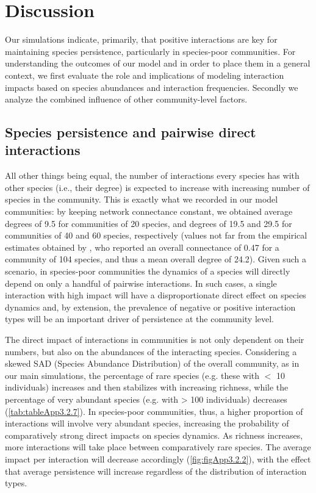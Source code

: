 \section{Discussion}

Our simulations indicate, primarily, that positive interactions are key for maintaining species persistence, particularly in species-poor communities. For understanding the outcomes of our model and in order to place them in a general context, we first evaluate the role and implications of modeling interaction impacts based on species abundances and interaction frequencies. Secondly we analyze the combined influence of other community-level factors.

\subsection*{Species persistence and pairwise direct interactions}

All other things being equal, the number of interactions every species has with other species (i.e., their degree) is expected to increase with increasing number of species in the community. This is exactly what we recorded in our model communities: by keeping network connectance constant, we obtained average degrees of 9.5 for communities of 20 species, and degrees of 19.5 and 29.5 for communities of 40 and 60 species, respectively (values not far from the empirical estimates obtained by \cite{Kefi2015}, who reported an overall connectance of 0.47 for a community of 104 species, and thus a mean overall degree of 24.2). Given such a scenario, in species-poor communities the dynamics of a species will directly depend on only a handful of pairwise interactions. In such cases, a single interaction with high impact will have a disproportionate direct effect on species dynamics and, by extension, the prevalence of negative or positive interaction types will be an important driver of persistence at the community level.

The direct impact of interactions in communities is not only dependent on their numbers, but also on the abundances of the interacting species. Considering a skewed SAD (Species Abundance Distribution) of the overall community, as in our main simulations, the percentage of rare species (e.g. these with $<$ 10 individuals) increases and then stabilizes with increasing richness, while the percentage of very abundant species (e.g. with > 100 individuals) decreases (\cref{tab:tableApp3.2.7}). In species-poor communities, thus, a higher proportion of interactions will involve very abundant species, increasing the probability of comparatively strong direct impacts on species dynamics. As richness increases, more interactions will take place between comparatively rare species. The average impact per interaction will decrease accordingly (\cref{fig:figApp3.2.2}), with the effect that average persistence will increase regardless of the distribution of interaction types.

